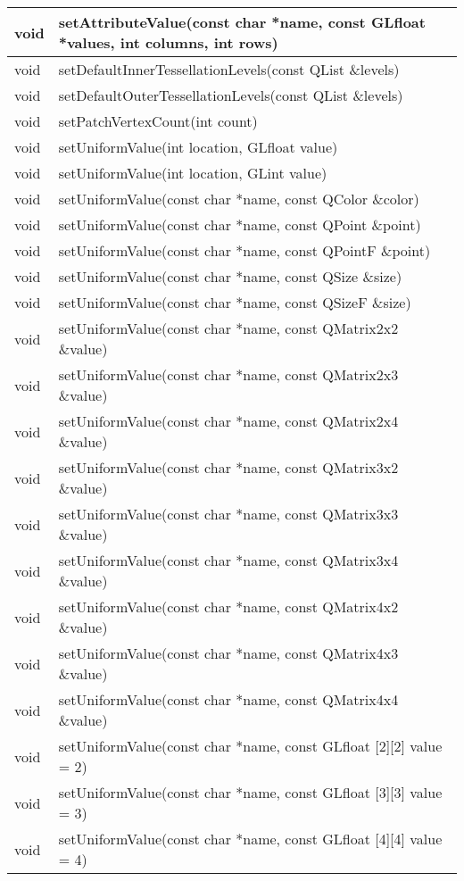 \begin{longtable}[l]{|l|m{34em}|}
    \hline
    void	&setAttributeValue(const char *name, const GLfloat *values, int columns, int rows) \\ 
    \hline
    void	& setDefaultInnerTessellationLevels(const QList \&levels) \\ 
    \hline
	void	& setDefaultOuterTessellationLevels(const QList \&levels) \\
	\hline
	void&	setPatchVertexCount(int count)\\
	\hline
	void&	setUniformValue(int location, GLfloat value)\\
	\hline
    void&	setUniformValue(int location, GLint value)\\
	\hline
	void&	setUniformValue(const char *name, const QColor \&color) \\
	\hline
	void&	setUniformValue(const char *name, const QPoint \&point)\\
	\hline
	void&	setUniformValue(const char *name, const QPointF \&point)\\
	\hline
	void&	setUniformValue(const char *name, const QSize \&size)\\
	\hline
	void&	setUniformValue(const char *name, const QSizeF \&size)\\
	\hline
    void	&setUniformValue(const char *name, const QMatrix2x2 \&value)\\
	\hline
	void	&setUniformValue(const char *name, const QMatrix2x3 \&value)\\
	\hline
	void&	setUniformValue(const char *name, const QMatrix2x4 \&value) \\
	\hline
	void&	setUniformValue(const char *name, const QMatrix3x2 \&value)\\
	\hline
	void&	setUniformValue(const char *name, const QMatrix3x3 \&value)\\
	\hline
	void&	setUniformValue(const char *name, const QMatrix3x4 \&value)\\
	\hline
	void&	setUniformValue(const char *name, const QMatrix4x2 \&value)\\
	\hline
	void&	setUniformValue(const char *name, const QMatrix4x3 \&value)\\
	\hline
	void&	setUniformValue(const char *name, const QMatrix4x4 \&value) \\
	\hline
    void	&setUniformValue(const char *name, const GLfloat [2][2] value = 2) \\
    \hline
    void	&setUniformValue(const char *name, const GLfloat [3][3] value = 3) \\
    \hline
    void	&setUniformValue(const char *name, const GLfloat [4][4] value = 4) \\ 

\end{longtable}
